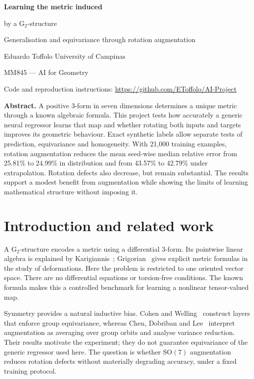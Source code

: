 \documentclass[a4paper,11pt]{article}
\newcommand{\Gtwo}{\mathrm{G}_2}
\newcommand{\SO}{\mathrm{SO}}
\begin{document}
\thispagestyle{plain}
{\LARGE\bfseries\color{ink}Learning the metric induced\par
by a $\Gtwo$-structure\par}
\vspace{4pt}
{\large Generalisation and equivariance through rotation augmentation\par}
\vspace{5pt}
Eduardo Toffolo \hfill University of Campinas\par
{\small MM845 --- AI for Geometry}\par
{\small Code and reproduction instructions:
\url{https://github.com/EToffolo/AI-Project}}\par

\vspace{5pt}
\textbf{Abstract.}
A positive $3$-form in seven dimensions determines a unique metric through a known
algebraic formula. This project tests how accurately a generic neural regressor
learns that map and whether rotating both inputs and targets improves its geometric
behaviour. Exact synthetic labels allow separate tests of prediction, equivariance
and homogeneity. With 21,000 training examples, rotation augmentation reduces the
mean seed-wise median relative error from 25.81\% to 24.99\% in distribution and
from 43.57\% to 42.79\% under extrapolation. Rotation defects also decrease, but
remain substantial. The results support a modest benefit from augmentation while
showing the limits of learning mathematical structure without imposing it.

\section{Introduction and related work}
A $\Gtwo$-structure encodes a metric using a differential $3$-form. Its pointwise
linear algebra is explained by Karigiannis~\cite{karigiannis}; Grigorian~\cite{grigorian}
gives explicit metric formulas in the study of deformations. Here the problem is
restricted to one oriented vector space. There are no differential equations or
torsion-free conditions. The known formula makes this a controlled benchmark for
learning a nonlinear tensor-valued map.

Symmetry provides a natural inductive bias. Cohen and Welling~\cite{cohen} construct
layers that enforce group equivariance, whereas Chen, Dobriban and Lee~\cite{chen}
interpret augmentation as averaging over group orbits and analyse variance reduction.
Their results motivate the experiment; they do not guarantee equivariance of the
generic regressor used here. The question is whether $\SO(7)$ augmentation reduces
rotation defects without materially degrading accuracy, under a fixed training protocol.
\end{document}

